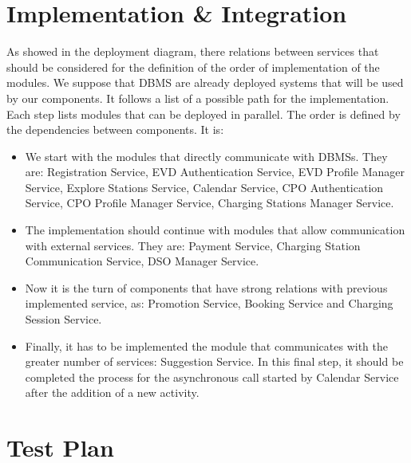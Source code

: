 \section{Implementation \& Integration}
\label{sec: implementation}%
As showed in the deployment diagram, there relations between services that should be considered for the definition of
the order of implementation of the modules.
We suppose that DBMS are already deployed systems that will be used by our components.
It follows a list of a possible path for the implementation.
Each step lists modules that can be deployed in parallel.
The order is defined by the dependencies between components.
It is:
\begin{itemize}
    \item We start with the modules that directly communicate with DBMSs. They are: Registration Service,
    EVD Authentication Service, EVD Profile Manager Service, Explore Stations Service, Calendar Service, CPO Authentication Service,
    CPO Profile Manager Service, Charging Stations Manager Service.
    \item The implementation should continue with modules that allow communication with external services.
    They are: Payment Service, Charging Station Communication Service, DSO Manager Service.
    \item Now it is the turn of components that have strong relations with previous implemented service, as:
    Promotion Service, Booking Service and Charging Session Service.
    \item Finally, it has to be implemented the module that communicates with the greater number of services: Suggestion Service.
    In this final step, it should be completed the process for the asynchronous call started by Calendar Service
    after the addition of a new activity.
\end{itemize}


\section{Test Plan}
\label{sec: test_plan}%
